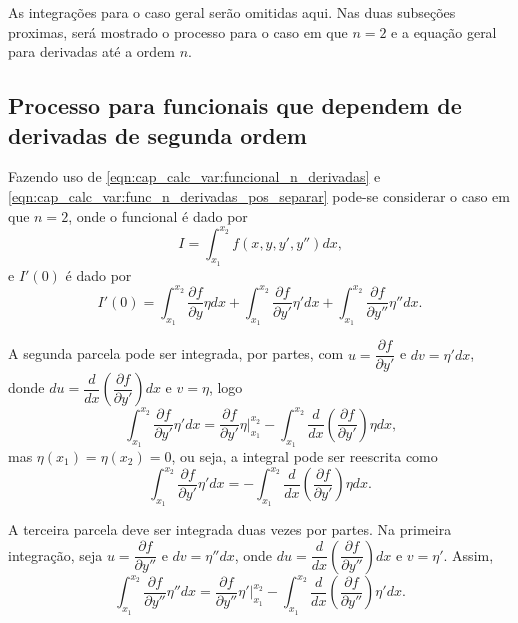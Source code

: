 \documentclass[
	12pt,				%
	openright,			%
    twoside,			%
	a4paper,			%
	english,			%
	french,				%
	spanish,			%
	brazil				%
	]{abntex2}
\numberwithin{lema}{chapter}
\numberwithin{teorema}{chapter}
\numberwithin{definicao}{chapter}
\numberwithin{exemplo}{chapter}
\numberwithin{figure}{chapter}
\begin{document}
As integrações para o caso geral serão omitidas aqui. Nas duas subseções proximas, será mostrado o processo para o caso em que $n=2$ e a equação geral para derivadas até a ordem $n$.

\subsection{Processo para funcionais que dependem de derivadas de segunda ordem}

Fazendo uso de \eqref{eqn:cap_calc_var:funcional_n_derivadas} e \eqref{eqn:cap_calc_var:func_n_derivadas_pos_separar} pode-se considerar o caso em que $n=2$, onde o funcional é dado por
$$
	I=\int_{x_1}^{x_2} f(x, y, y', y'')dx
	\text{,}
$$
e $I'(0)$ é dado por
\begin{equation}
	\label{eqn:cap_calc_var:func_2_derivada_integracao}
	I'(0)=
	\int_{x_1}^{x_2}
		\frac{\partial f}{\partial y}
		\eta
	dx
	+
	\int_{x_1}^{x_2}
		\frac{\partial f}{\partial y'}
		\eta'
	dx
	+
	\int_{x_1}^{x_2}
		\frac{\partial f}{\partial y''}
		\eta''
	dx
	\text{.}
\end{equation}

A segunda parcela pode ser integrada, por partes, com $u=\dfrac{\partial f}{\partial y'}$ e $dv=\eta'dx$, donde 
$du=\dfrac{d}{dx} \left (
	\dfrac{\partial f}{\partial y'}
\right ) dx$ e $v=\eta$, logo
$$
	\int_{x_1}^{x_2} \frac{\partial f}{\partial y'}\eta ' dx
	=
	\frac{\partial f}{\partial y'}\eta \Big |_{x_1}^{x_2}
	-
	\int_{x_1}^{x_2}
		\frac{d}{dx} \left (
			\frac{\partial f}{\partial y'}
		\right ) \eta dx
	\text{,}
$$
mas $\eta(x_1)=\eta(x_2)=0$, ou seja, a integral pode ser reescrita como
\begin{equation}
	\label{eqn:cap_calc_var:func_2_derivadas_membro2}
	\int_{x_1}^{x_2} \frac{\partial f}{\partial y'}\eta ' dx
	=
	-
	\int_{x_1}^{x_2}
		\frac{d}{dx} \left (
			\frac{\partial f}{\partial y'}
		\right ) \eta dx
	\text{.}
\end{equation}

A terceira parcela deve ser integrada duas vezes por partes. Na primeira integração, seja $u=\dfrac{\partial f}{\partial y''}$ e $dv=\eta''dx$, onde 
$du=\dfrac{d}{dx} \left (
	\dfrac{\partial f}{\partial y''}
\right) dx$ e $v=\eta '$. Assim,
\begin{equation}
	\label{eqn:cap_calc_var:el_diff_2_eta2}
	\int_{x_1}^{x_2}
		\frac{\partial f}{\partial y''}
		\eta ''
	dx
	=
	\frac{\partial f}{\partial y''} \eta ' \Big |_{x_1}^{x_2}
	-
	\int_{x_1}^{x_2} \frac{d}{dx}
		\left ( 
			\frac{\partial f}{\partial y''}
		\right )
	\eta ' dx
	\text{.}
\end{equation}
\end{document}
